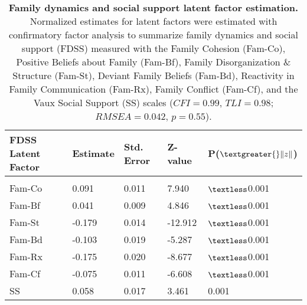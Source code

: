 \documentclass[utf8]{article}
\begin{document}
\begin{table}[h!]
\begin{tabular}{lllll}
FDSS Latent Factor & Estimate & Std. Error & Z-value & P($\textgreater{}\|z\|$) \\ \hline
                   &          &            &         &                          \\
Fam-Co             & 0.091    & 0.011      & 7.940   & $\textless$0.001                    \\
Fam-Bf             & 0.041    & 0.009      & 4.846   & $\textless$0.001                    \\
Fam-St             & -0.179   & 0.014      & -12.912 & $\textless$0.001                    \\
Fam-Bd             & -0.103   & 0.019      & -5.287  & $\textless$0.001                    \\
Fam-Rx             & -0.175   & 0.020      & -8.677  & $\textless$0.001                    \\
Fam-Cf             & -0.075   & 0.011      & -6.608  & $\textless$0.001                    \\
SS                 & 0.058    & 0.017      & 3.461   & 0.001                   
\end{tabular}
\caption{\textbf{Family dynamics and social support latent factor estimation.} Normalized estimates for latent factors were estimated with confirmatory factor analysis to summarize family dynamics and social support (FDSS) measured with the Family Cohesion (Fam-Co), Positive Beliefs about Family (Fam-Bf), Family Disorganization \& Structure (Fam-St), Deviant Family Beliefs (Fam-Bd), Reactivity in Family Communication (Fam-Rx), Family Conflict (Fam-Cf), and the Vaux Social Support (SS) scales ($CFI=0.99$, $TLI=0.98$; $RMSEA=0.042$, $p=0.55$).\label{tab:5}}
\end{table}
\end{document}
